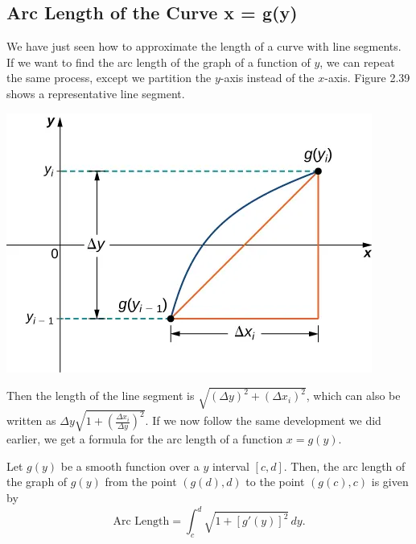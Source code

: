 \documentclass{report}
\begin{document}
    \subsection*{Arc Length of the Curve x = g(y)}
    \bigbreak \noindent 
    \begin{minipage}[]{0.47\textwidth}
        We have just seen how to approximate the length of a curve with line segments. If we want to find the arc length of the graph of a function of $y$, we can repeat the same process, except we partition the $y$-axis instead of the $x$-axis. Figure 2.39 shows a representative line segment.
    \end{minipage}
    \begin{minipage}[]{0.47\textwidth}
        \includegraphics[scale=0.5]{./figures/graph30.png}
    \end{minipage}
    \bigbreak \noindent 
    Then the length of the line segment is $\sqrt{(\Delta y)^2 + (\Delta x_i)^2}$, which can also be written as $\Delta y \sqrt{1 + \left(\frac{\Delta x_i}{\Delta y}\right)^2}$. If we now follow the same development we did earlier, we get a formula for the arc length of a function $x = g(y)$.
    \bigbreak \noindent \bigbreak \noindent 
    \begin{thrm}[Arc Length for $x = g(y)$]
        Let $g(y)$ be a smooth function over a $y$ interval $[c,d]$. Then, the arc length of the graph of $g(y)$ from the point $(g(d), d)$ to the point $(g(c), c)$ is given by
        \[
        \text{Arc Length} = \int_{c}^{d} \sqrt{1 + [g'(y)]^2} \, dy.
        \]
    \end{thrm}

    \pagebreak 
\end{document}
